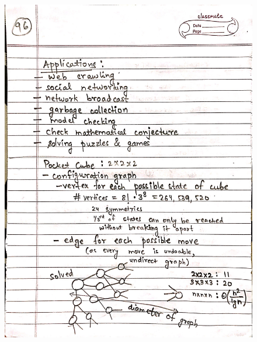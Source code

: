 \begin{figure}[H]
    \centering
    \includegraphics[scale=0.25]{"./MIT-6.006/MIT-6006-096"}
\end{figure}
\newpage

